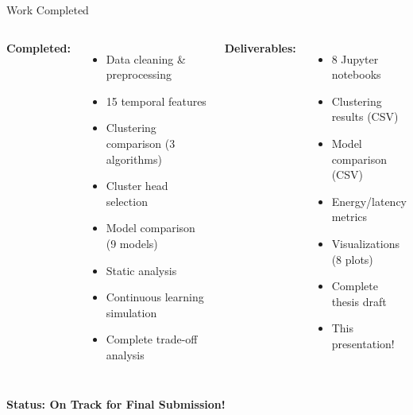 \documentclass[aspectratio=169]{beamer}
\begin{document}
\begin{frame}{Work Completed \checkmark}
\begin{columns}[T]
\textbf{Completed:}
\begin{itemize}
    \item[\checkmark] Data cleaning \& preprocessing
    \item[\checkmark] 15 temporal features
    \item[\checkmark] Clustering comparison (3 algorithms)
    \item[\checkmark] Cluster head selection
    \item[\checkmark] Model comparison (9 models)
    \item[\checkmark] Static analysis
    \item[\checkmark] Continuous learning simulation
    \item[\checkmark] Complete trade-off analysis
\end{itemize}

\textbf{Deliverables:}
\begin{itemize}
    \item 8 Jupyter notebooks
    \item Clustering results (CSV)
    \item Model comparison (CSV)
    \item Energy/latency metrics
    \item Visualizations (8 plots)
    \item Complete thesis draft
    \item This presentation!
\end{itemize}
\end{columns}

\vspace{0.3cm}
\begin{center}
\Large \textcolor{iiitlgreen}{\textbf{Status: On Track for Final Submission!}}
\end{center}
\end{frame}
\end{document}
